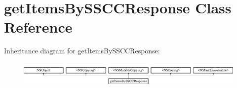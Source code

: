 \hypertarget{interfaceget_items_by_s_s_c_c_response}{}\section{get\+Items\+By\+S\+S\+C\+C\+Response Class Reference}
\label{interfaceget_items_by_s_s_c_c_response}
Inheritance diagram for get\+Items\+By\+S\+S\+C\+C\+Response\+:\begin{figure}[H]
\begin{center}
\leavevmode
\includegraphics[height=1.325444cm]{interfaceget_items_by_s_s_c_c_response}
\end{center}
\end{figure}
